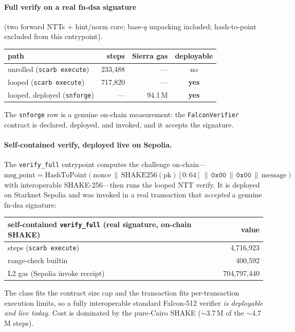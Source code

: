 \documentclass[11pt]{article}
\begin{document}
\paragraph{Full verify on a real fn-dsa signature} (two forward NTTs $+$ hint/norm core; base-$q$
unpacking included; hash-to-point excluded from this entrypoint).
\begin{center}
\begin{tabular}{lrrc}
\toprule
path & steps & Sierra gas & deployable \\
\midrule
unrolled (\texttt{scarb execute}) & 233{,}488 & --- & no \\
looped (\texttt{scarb execute}) & 717{,}820 & --- & \textbf{yes} \\
looped, deployed (\texttt{snforge}) & --- & 94.1\,M & \textbf{yes} \\
\bottomrule
\end{tabular}
\end{center}
The \texttt{snforge} row is a genuine on-chain measurement: the \texttt{FalconVerifier} contract is
declared, deployed, and invoked, and it accepts the signature.

\paragraph{Self-contained verify, deployed live on Sepolia.} The \texttt{verify\_full} entrypoint
computes the challenge on-chain---$\text{msg\_point}=\text{HashToPoint}(\text{nonce}\,\|\,
\text{SHAKE256}(\text{pk})[0{:}64]\,\|\,\texttt{0x00}\,\|\,\texttt{0x00}\,\|\,\text{message})$ with
interoperable SHAKE-256---then runs the looped NTT verify. It is deployed on Starknet Sepolia and
was invoked in a real transaction that \emph{accepted} a genuine fn-dsa signature:
\begin{center}
\begin{tabular}{lr}
\toprule
self-contained \texttt{verify\_full} (real signature, on-chain SHAKE) & value \\
\midrule
steps (\texttt{scarb execute}) & 4{,}716{,}923 \\
range-check builtin & 400{,}592 \\
L2 gas (Sepolia invoke receipt) & 704{,}797{,}440 \\
\bottomrule
\end{tabular}
\end{center}
The class fits the contract size cap and the transaction fits per-transaction execution limits, so
a fully interoperable standard Falcon-512 verifier \emph{is deployable and live today}. Cost is
dominated by the pure-Cairo SHAKE ($\sim$3.7\,M of the $\sim$4.7\,M steps).
\end{document}
